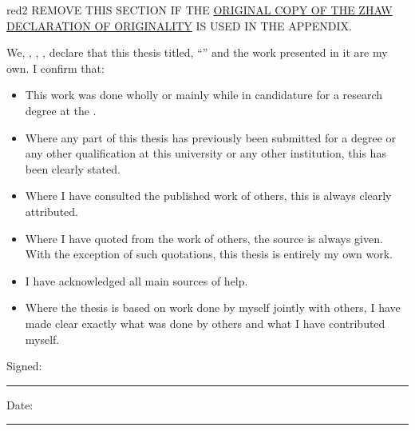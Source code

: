 

\begin{declaration}
\addchaptertocentry{\authorshipname} %

\begin{textbox}{red}{2}
REMOVE THIS SECTION IF THE \href{https://www.zhaw.ch/en/lsfm/study/studiweb/master-ls/masters-thesis/}{ORIGINAL COPY OF THE ZHAW DECLARATION OF ORIGINALITY} IS USED IN THE APPENDIX.
\end{textbox}
\vspace{1cm}

\noindent We, \autnameA, \autnameB, \autnameC, declare that this thesis titled, \enquote{\ttitle} and the work presented in it are my own. I confirm that:

\begin{itemize} 
\item This work was done wholly or mainly while in candidature for a research degree at the \univname.
\item Where any part of this thesis has previously been submitted for a degree or any other qualification at this university or any other institution, this has been clearly stated.
\item Where I have consulted the published work of others, this is always clearly attributed.
\item Where I have quoted from the work of others, the source is always given. With the exception of such quotations, this thesis is entirely my own work.
\item I have acknowledged all main sources of help.
\item Where the thesis is based on work done by myself jointly with others, I have made clear exactly what was done by others and what I have contributed myself.
\end{itemize}
\vspace{1cm}

\noindent Signed:\\
\rule[0.5em]{25em}{0.5pt} %
 
\noindent Date:\\
\rule[0.5em]{25em}{0.5pt} %
\end{declaration}
